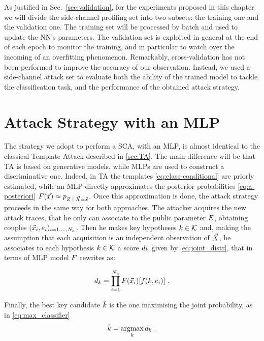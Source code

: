 As justified in Sec.~\ref{sec:validation}, for the experiments proposed in this chapter we will divide the side-channel profiling set into two subsets: the training one and the validation one. The training set will be processed by batch and used to update the NN's parameters. The validation set is exploited in general at the end of each epoch to monitor the training, and in particular to watch over the incoming of an overfitting phenomenon. Remarkably, cross-validation has not been performed to improve the accuracy of our observation. Instead, we used a side-channel attack set to  evaluate both the ability of the trained model to tackle the classification task, and the performance of the obtained attack strategy.

\section{Attack Strategy with an MLP}\label{sec:attackNN}
The strategy we adopt to perform a SCA, with an MLP, is almost identical to the classical Template Attack described in \ref{sec:TA}. The main difference will be that TA is based on generative models, while MLPs are used to construct a discriminative one. Indeed, in TA the templates \eqref{eq:class-conditional} are priorly estimated, while an MLP directly approximates the posterior probabilities \eqref{eq:a-posteriori} $\MLmodel(\vLeakVec) \approx \pdf_{\given{\sensRandVar}{\vaLeakVec=\vLeakVec}}$. Once this approximation is done, the attack strategy proceeds in the same way for both approaches. The attacker acquires the new attack traces, that he only can associate to the public parameter $E$, obtaining couples  $(\vec{x}_i, e_i)_{i=1, \dots , N_a}$. Then he makes key hypotheses $k \in \mathcal{K}$ and, making the assumption that each acquisition is an independent observation of $\vec{X}$, he associates to each hypothesis $k \in \mathcal{K}$ a score $d_k$ given by \eqref{eq:joint_distr}, that in terms of MLP model $F$ rewrites  as:

\begin{equation}\label{eq:NN_SCA}
d_{k} = \prod_{i=1}^{N_a} F(\vec{x}_i)[f(k,e_i)] \mbox{ .}
\end{equation}

Finally, the best key candidate $\hat{k}$ is the one maximising the joint probability, as in \eqref{eq:max_classifier}
\begin{equation}
\hat{k} = \operatorname*{argmax}_{k} d_{k} \mbox{ .}
\end{equation}


